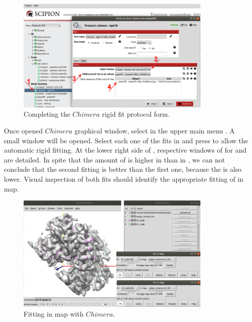 \begin{itemize}
 \begin{figure}[H]
  \centering 
  \captionsetup{width=.7\linewidth} 
  \includegraphics[width=0.85\textwidth]{Images/Fig21}
  \caption{Completing the $Chimera$ rigid fit protocol form.}
  \label{fig:chimera_rigid_fit}
  \end{figure}
  
  Once opened $Chimera$ graphical window, select in the upper main menu . A small window will be opened. Select each one of the fits in  and press  to allow the automatic rigid fitting. At the lower right side of , respective windows of  for  and  are detailed. In spite that the amount of  is higher in  than in , we can not conclude that the second fitting is better than the first one, because the  is also lower. Visual inspection of both fits should identify the appropriate fitting of  in map.
  
  \begin{figure}[H]
  \centering 
  \captionsetup{width=.7\linewidth} 
  \includegraphics[width=0.85\textwidth]{Images/Fig22}
  \caption{Fitting in map with $Chimera$.}
  \label{fig:chimera_fit_in_map}
  \end{figure}
  

\end{itemize}
